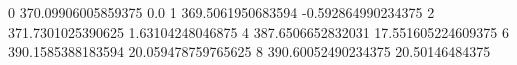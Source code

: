 0 370.09906005859375 0.0
1 369.5061950683594 -0.592864990234375
2 371.7301025390625 1.63104248046875
4 387.6506652832031 17.551605224609375
6 390.1585388183594 20.059478759765625
8 390.60052490234375 20.50146484375
